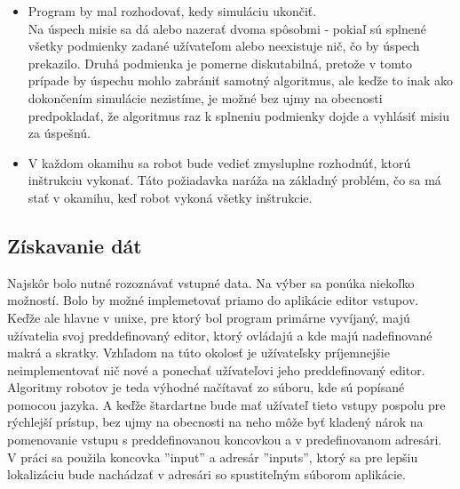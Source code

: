\begin {itemize}
\item Program by mal rozhodovať, kedy simuláciu ukončiť.\\
	Na úspech misie sa dá alebo nazerať dvoma spôsobmi - pokiaľ sú splnené všetky podmienky zadané užívateľom alebo neexistuje nič, čo by úspech prekazilo. Druhá podmienka je pomerne diskutabilná, pretože v tomto prípade by úspechu mohlo zabrániť samotný algoritmus, ale keďže to inak ako dokončením simulácie nezistíme, je možné bez ujmy na obecnosti predpokladať, že algoritmus raz k splneniu podmienky dojde a vyhlásiť misiu za úspešnú.
\item V každom okamihu sa robot bude vedieť zmysluplne rozhodnúť, ktorú inštrukciu vykonať. Táto požiadavka naráža na základný problém, čo sa má stať v okamihu, keď robot vykoná všetky inštrukcie. 
\end{itemize}

\subsection {Získavanie dát}
\indent Najskôr bolo nutné rozoznávať vstupné data. Na výber sa ponúka niekoľko možností. Bolo by možné implemetovať priamo do aplikácie editor vstupov. Keďže ale hlavne v unixe, pre ktorý bol program primárne vyvíjaný, majú užívatelia svoj preddefinovaný editor, ktorý ovládajú a kde majú nadefinované makrá a skratky. Vzhľadom na túto okolosť je užívateľsky príjemnejšie neimplementovať nič nové a ponechať užívateľovi jeho preddefinovaný editor.\\
Algoritmy robotov je teda výhodné načítavať zo súboru, kde sú popísané pomocou jazyka. A keďže štardartne bude mať užívateľ tieto vstupy pospolu pre rýchlejší prístup, bez ujmy na obecnosti na neho môže byť kladený nárok na pomenovanie vstupu s preddefinovanou koncovkou a v predefinovanom adresári. V práci sa použila koncovka ''input'' a adresár ''inputs'', ktorý sa pre lepšiu lokalizáciu bude nachádzať v adresári so spustiteľným súborom aplikácie.

